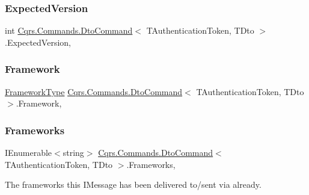 \subsubsection{\texorpdfstring{Expected\+Version}{ExpectedVersion}}
{\footnotesize\ttfamily int \hyperlink{classCqrs_1_1Commands_1_1DtoCommand}{Cqrs.\+Commands.\+Dto\+Command}$<$ T\+Authentication\+Token, T\+Dto $>$.Expected\+Version\hspace{0.3cm}{\ttfamily [get]}, {\ttfamily [set]}}

\mbox{\label{classCqrs_1_1Commands_1_1DtoCommand_aef8db1c8e62c27c09abd1590f05bfba1}} 
\subsubsection{\texorpdfstring{Framework}{Framework}}
{\footnotesize\ttfamily \hyperlink{namespaceCqrs_1_1Messages_af06a7e6cd2609043d0f2f5f3419f81e3}{Framework\+Type} \hyperlink{classCqrs_1_1Commands_1_1DtoCommand}{Cqrs.\+Commands.\+Dto\+Command}$<$ T\+Authentication\+Token, T\+Dto $>$.Framework\hspace{0.3cm}{\ttfamily [get]}, {\ttfamily [set]}}

\mbox{\label{classCqrs_1_1Commands_1_1DtoCommand_a2df20833afc756e5f7d553e4ed28406e}} 
\subsubsection{\texorpdfstring{Frameworks}{Frameworks}}
{\footnotesize\ttfamily I\+Enumerable$<$string$>$ \hyperlink{classCqrs_1_1Commands_1_1DtoCommand}{Cqrs.\+Commands.\+Dto\+Command}$<$ T\+Authentication\+Token, T\+Dto $>$.Frameworks\hspace{0.3cm}{\ttfamily [get]}, {\ttfamily [set]}}



The frameworks this I\+Message has been delivered to/sent via already. 

\mbox{\label{classCqrs_1_1Commands_1_1DtoCommand_a14212f77b9341f240f77efa6d6adf211}} 
